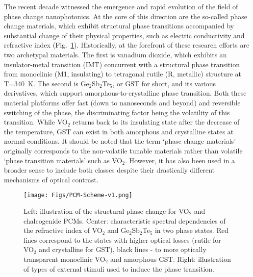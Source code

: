 \documentclass[journal=chreay,manuscript=review]{achemso}
\begin{document}
The recent decade witnessed the emergence and rapid evolution of the field of phase change nanophotonics. \cite{wuttig2017phase,hail2019optical,abdollahramezani2021dynamic} At the core of this direction are the so-called phase change materials, which exhibit structural phase transitions accompanied by substantial change of their physical properties, such as electric conductivity and refractive index (Fig.~\ref{fig:PCM-scheme}). Historically, at the forefront of these research efforts are two archetypal materials. The first is vanadium dioxide, which exhibits an insulator-metal transition (IMT) concurrent with a structural phase transition from monoclinic (M1, insulating) to tetragonal rutile (R, metallic) structure at T=340~K. The second is Ge$_2$Sb$_2$Te$_5$, or GST for short, and its various derivatives, which support amorphous-to-crystalline phase transition\cite{wuttig2017phase}. Both these material platforms offer fast (down to nanoseconds and beyond) and reversible switching of the phase, the discriminating factor being the volatility of this transition. While VO$_2$ returns back to its insulating state after the decrease of the temperature, GST can exist in both amorphous and crystalline states at normal conditions. It should be noted that the term ‘phase change materials’ originally corresponds to the non-volatile tunable materials rather than volatile ‘phase transition materials’ such as VO$_2$\cite{wuttig2017phase}. However, it has also been used in a broader sense to include both classes despite their drastically different mechanisms of optical contrast. 


\begin{figure}[t]
    \centering
    \texttt{[image: Figs/PCM-Scheme-v1.png]}
    \caption{
    Left: illustration of the structural phase change for VO$_2$ and chalcogenide PCMs. Center: characteristic spectral dependencies of the refractive index of VO$_2$ and Ge$_2$Sb$_2$Te$_5$ in two phase states. Red lines correspond to the states with higher optical losses (rutile for VO$_2$ and crystalline for GST), black lines - to more optically transparent monoclinic VO$_2$ and amorphous GST. Right: illustration of types of external stimuli used to induce the phase transition.}
    \label{fig:PCM-scheme}
\end{figure}
\end{document}
